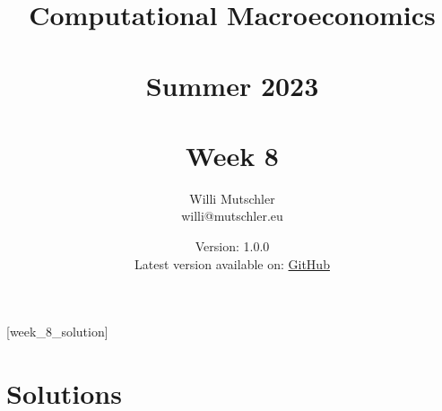 
\newif\ifDisplaySolutions\DisplaySolutionstrue


\title{Computational Macroeconomics\\~\\Summer 2023\\~\\Week 8}
\author{Willi Mutschler\\willi@mutschler.eu}
\date{Version: 1.0.0\\Latest version available on: \href{https://github.com/wmutschl/Computational-Macroeconomics/releases/latest/download/week_8.pdf}{GitHub}}
\maketitle\thispagestyle{empty}

\newpage
{}[week_8_solution]
\tableofcontents\thispagestyle{empty}\newpage

\setcounter{page}{1}
\newpage
\newpage
\newpage
\newpage

\printbibliography
\newpage

\ifDisplaySolutions 
\newpage
\appendix
\section{Solutions}

\fi
